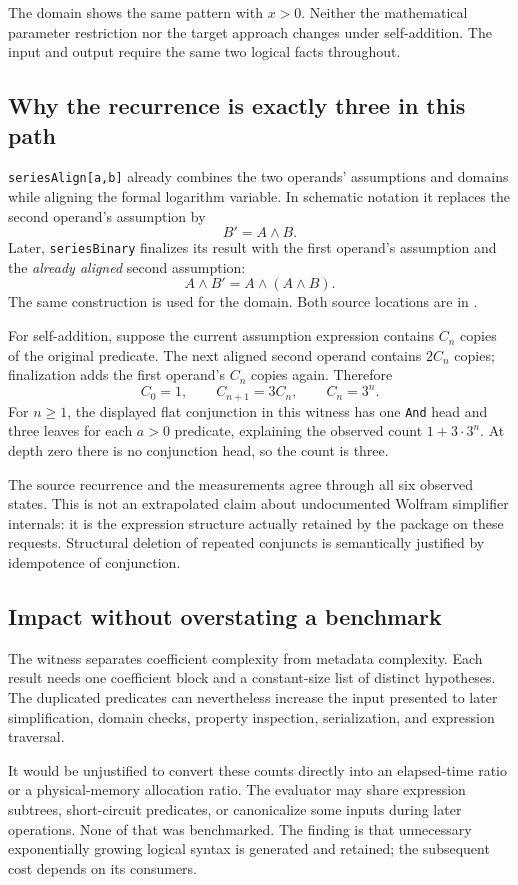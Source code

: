 \documentclass[11pt,a4paper]{article}
\begin{document}
The domain shows the same pattern with $x>0$. Neither the mathematical parameter restriction nor the target approach changes under self-addition. The input and output require the same two logical facts throughout.

\subsection{Why the recurrence is exactly three in this path}
\texttt{seriesAlign[a,b]} already combines the two operands' assumptions and domains while aligning the formal logarithm variable. In schematic notation it replaces the second operand's assumption by
\[
 B' = A\wedge B.
\]
Later, \texttt{seriesBinary} finalizes its result with the first operand's assumption and the \emph{already aligned} second assumption:
\[
 A\wedge B'=A\wedge(A\wedge B).
\]
The same construction is used for the domain. Both source locations are in .\cite{ops}

For self-addition, suppose the current assumption expression contains $C_n$ copies of the original predicate. The next aligned second operand contains $2C_n$ copies; finalization adds the first operand's $C_n$ copies again. Therefore
\[
 C_0=1,\qquad C_{n+1}=3C_n,\qquad C_n=3^n.
\]
For $n\ge1$, the displayed flat conjunction in this witness has one \texttt{And} head and three leaves for each $a>0$ predicate, explaining the observed count $1+3\cdot3^n$. At depth zero there is no conjunction head, so the count is three.

The source recurrence and the measurements agree through all six observed states. This is not an extrapolated claim about undocumented Wolfram simplifier internals: it is the expression structure actually retained by the package on these requests. Structural deletion of repeated conjuncts is semantically justified by idempotence of conjunction.\cite{and}

\subsection{Impact without overstating a benchmark}
The witness separates coefficient complexity from metadata complexity. Each result needs one coefficient block and a constant-size list of distinct hypotheses. The duplicated predicates can nevertheless increase the input presented to later simplification, domain checks, property inspection, serialization, and expression traversal.

It would be unjustified to convert these counts directly into an elapsed-time ratio or a physical-memory allocation ratio. The evaluator may share expression subtrees, short-circuit predicates, or canonicalize some inputs during later operations. None of that was benchmarked. The finding is that unnecessary exponentially growing logical syntax is generated and retained; the subsequent cost depends on its consumers.
\end{document}
